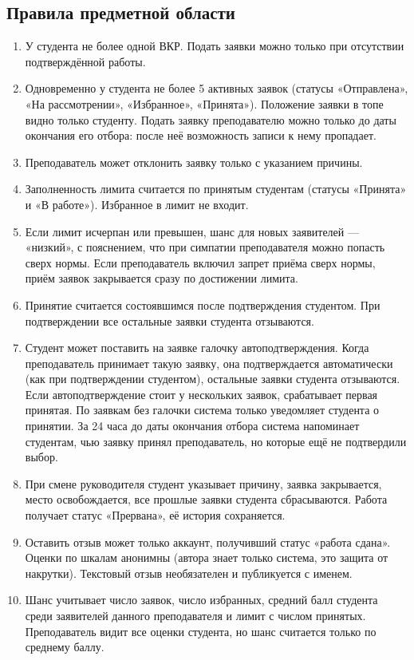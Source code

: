 \documentclass[a4paper,12pt]{article}
\begin{document}
\subsection{Правила предметной области}\label{sec:rules}
\begin{enumerate}[label=R\arabic*.]
  \item У студента не более одной ВКР. Подать заявки можно только при отсутствии подтверждённой работы.
  \item Одновременно у студента не более 5 активных заявок (статусы «Отправлена», «На рассмотрении», «Избранное», «Принята»). Положение заявки в топе видно только студенту. Подать заявку преподавателю можно только до даты окончания его отбора: после неё возможность записи к нему пропадает.
  \item Преподаватель может отклонить заявку только с указанием причины.
  \item Заполненность лимита считается по принятым студентам (статусы «Принята» и «В работе»). Избранное в лимит не входит.
  \item Если лимит исчерпан или превышен, шанс для новых заявителей — «низкий», с пояснением, что при симпатии преподавателя можно попасть сверх нормы. Если преподаватель включил запрет приёма сверх нормы, приём заявок закрывается сразу по достижении лимита.
  \item Принятие считается состоявшимся после подтверждения студентом. При подтверждении все остальные заявки студента отзываются.
  \item Студент может поставить на заявке галочку автоподтверждения. Когда преподаватель принимает такую заявку, она подтверждается автоматически (как при подтверждении студентом), остальные заявки студента отзываются. Если автоподтверждение стоит у нескольких заявок, срабатывает первая принятая. По заявкам без галочки система только уведомляет студента о принятии. За 24 часа до даты окончания отбора система напоминает студентам, чью заявку принял преподаватель, но которые ещё не подтвердили выбор.
  \item При смене руководителя студент указывает причину, заявка закрывается, место освобождается, все прошлые заявки студента сбрасываются. Работа получает статус «Прервана», её история сохраняется.
  \item Оставить отзыв может только аккаунт, получивший статус «работа сдана». Оценки по шкалам анонимны (автора знает только система, это защита от накрутки). Текстовый отзыв необязателен и публикуется с именем.
  \item Шанс учитывает число заявок, число избранных, средний балл студента среди заявителей данного преподавателя и лимит с числом принятых. Преподаватель видит все оценки студента, но шанс считается только по среднему баллу.

\end{enumerate}
\end{document}
